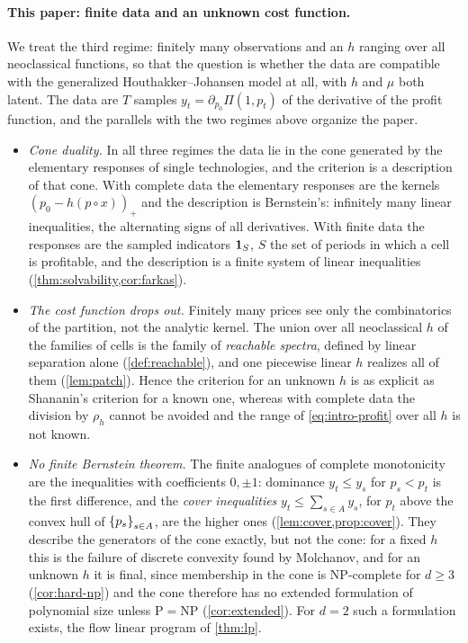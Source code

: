 \paragraph{This paper: finite data and an unknown cost function.}
We treat the third regime: finitely many observations and an $h$ ranging over all neoclassical functions, so that the question is whether the data are compatible with the generalized Houthakker--Johansen model at all, with $h$ and $\mu$ both latent. The data are $T$ samples $y_t=\partial_{p_0}\Pi(1,p_t)$ of the derivative of the profit function, and the parallels with the two regimes above organize the paper.
\begin{itemize}
\item \emph{Cone duality.} In all three regimes the data lie in the cone generated by the elementary responses of single technologies, and the criterion is a description of that cone. With complete data the elementary responses are the kernels $(p_0-h(p\circ x))_+$ and the description is Bernstein's: infinitely many linear inequalities, the alternating signs of all derivatives. With finite data the responses are the sampled indicators $\mathbf 1_{S}$, $S$ the set of periods in which a cell is profitable, and the description is a finite system of linear inequalities (\cref{thm:solvability,cor:farkas}).
\item \emph{The cost function drops out.} Finitely many prices see only the combinatorics of the partition, not the analytic kernel. The union over all neoclassical $h$ of the families of cells is the family of \emph{reachable spectra}, defined by linear separation alone (\cref{def:reachable}), and one piecewise linear $h$ realizes all of them (\cref{lem:patch}). Hence the criterion for an unknown $h$ is as explicit as Shananin's criterion for a known one, whereas with complete data the division by $\rho_h$ cannot be avoided and the range of \eqref{eq:intro-profit} over all $h$ is not known.
\item \emph{No finite Bernstein theorem.} The finite analogues of complete monotonicity are the inequalities with coefficients $0,\pm1$: dominance $y_t\le y_s$ for $p_s<p_t$ is the first difference, and the \emph{cover inequalities} $y_t\le\sum_{s\in A}y_s$, for $p_t$ above the convex hull of $\left\{ p_s \right\}_{s\in A}$, are the higher ones (\cref{lem:cover,prop:cover}). They describe the generators of the cone exactly, but not the cone: for a fixed $h$ this is the failure of discrete convexity found by Molchanov, and for an unknown $h$ it is final, since membership in the cone is NP-complete for $d\ge3$ (\cref{cor:hard-np}) and the cone therefore has no extended formulation of polynomial size unless $\mathrm P=\mathrm{NP}$ (\cref{cor:extended}). For $d=2$ such a formulation exists, the flow linear program of \cref{thm:lp}.

\end{itemize}
